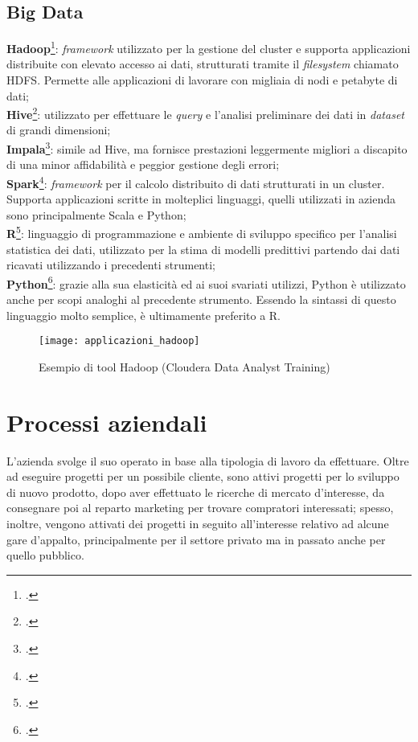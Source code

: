 \subsection{Big Data}
\textbf{Hadoop}\footcite{https://hadoop.apache.org/}: \textit{framework} utilizzato per la gestione del \gls{cluster} e supporta applicazioni distribuite con elevato accesso ai dati, strutturati tramite il \textit{filesystem} chiamato \gls{HDFS}. Permette alle applicazioni di lavorare con migliaia di nodi e petabyte di dati;\\
\textbf{Hive}\footcite{https://hive.apache.org/}: utilizzato per effettuare le \textit{query} e l'analisi preliminare dei dati in \textit{dataset} di grandi dimensioni;\\
\textbf{Impala}\footcite{https://impala.apache.org/}: simile ad Hive, ma fornisce prestazioni leggermente migliori a discapito di una minor affidabilità e peggior gestione degli errori; \\
\textbf{Spark}\footcite{https://spark.apache.org/}: \textit{framework} per il calcolo distribuito di dati strutturati in un \gls{cluster}. Supporta applicazioni scritte in molteplici linguaggi, quelli utilizzati in azienda sono principalmente Scala e Python;\\
\textbf{R}\footcite{https://www.r-project.org/}: linguaggio di programmazione e ambiente di sviluppo specifico per l'analisi statistica dei dati, utilizzato per la stima di modelli predittivi partendo dai dati ricavati utilizzando i precedenti strumenti;\\
\textbf{Python}\footcite{https://www.python.org/}: grazie alla sua elasticità ed ai suoi svariati utilizzi, Python è utilizzato anche per scopi analoghi al precedente strumento. Essendo la sintassi di questo linguaggio molto semplice, è ultimamente preferito a R.\\
\begin{figure}[!h] 
	\centering 
	\texttt{[image: applicazioni\_hadoop]} 
	\caption{Esempio di tool Hadoop (Cloudera Data Analyst Training)}
\end{figure}

\newpage
\section{Processi aziendali}

L'azienda svolge il suo operato in base alla tipologia di lavoro da effettuare. Oltre ad eseguire progetti per un possibile cliente, sono attivi progetti per lo sviluppo di nuovo prodotto, dopo aver effettuato le ricerche di mercato d'interesse, da consegnare poi al reparto marketing per trovare compratori interessati; spesso, inoltre, vengono attivati dei progetti in seguito all'interesse relativo ad alcune gare d'appalto, principalmente per il settore privato ma in passato anche per quello pubblico.

